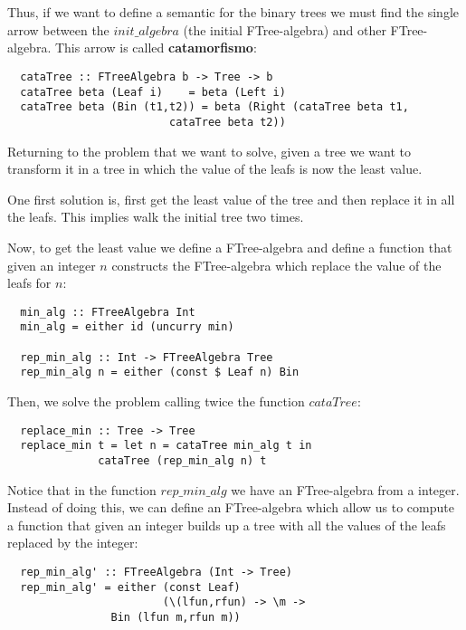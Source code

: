 \documentclass[a4paper,10pt]{article}
\begin{document}
\

\

Thus, if we want to define a semantic for the binary trees we must find the single arrow
between the $init\_algebra$ (the initial FTree-algebra) and other FTree-algebra. This arrow
is called \textbf{catamorfismo}:

\begin{lstlisting}
  cataTree :: FTreeAlgebra b -> Tree -> b
  cataTree beta (Leaf i)    = beta (Left i)
  cataTree beta (Bin (t1,t2)) = beta (Right (cataTree beta t1,
					     cataTree beta t2))
\end{lstlisting}

Returning to the problem that we want to solve, given a tree we want to transform it
in a tree in which the value of the leafs is now the least value.

One first solution is, first get the least value of the tree and then replace it in
all the leafs. This implies walk the initial tree two times.

Now, to get the least value we define a FTree-algebra and define a function that
given an integer $n$ constructs the FTree-algebra which replace the value of the leafs
for $n$:

\begin{lstlisting}
  min_alg :: FTreeAlgebra Int
  min_alg = either id (uncurry min)

  rep_min_alg :: Int -> FTreeAlgebra Tree
  rep_min_alg n = either (const $ Leaf n) Bin
\end{lstlisting}

Then, we solve the problem calling twice the function $cataTree$:

\begin{lstlisting}
  replace_min :: Tree -> Tree
  replace_min t = let n = cataTree min_alg t in
		      cataTree (rep_min_alg n) t
\end{lstlisting}

Notice that in the function $rep\_min\_alg$ we have an FTree-algebra from a integer.
Instead of doing this, we can define an FTree-algebra which allow us to compute a
function that given an integer builds up a tree with all the values of the leafs
replaced by the integer:

\begin{lstlisting}
  rep_min_alg' :: FTreeAlgebra (Int -> Tree)
  rep_min_alg' = either (const Leaf) 
                        (\(lfun,rfun) -> \m -> 
			    Bin (lfun m,rfun m))
\end{lstlisting}
\end{document}
